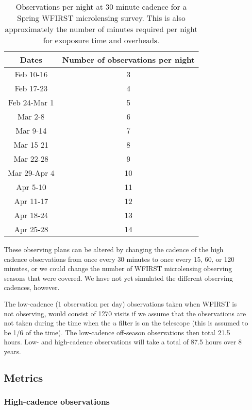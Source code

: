 \begin{table}
\begin{tabular}{ c c }
  {\bf Dates} & {\bf Number of observations per night}\\
\hline
Feb 10-16     &  3 \\
Feb 17-23     &  4 \\
Feb 24-Mar 1  &  5 \\
Mar 2-8       &  6 \\
Mar 9-14      &  7 \\
Mar 15-21     &  8 \\
Mar 22-28     &  9 \\
Mar 29-Apr 4  & 10 \\
Apr 5-10      & 11 \\
Apr 11-17     & 12 \\
Apr 18-24     & 13 \\
Apr 25-28     & 14 \\
\end{tabular}
\caption{Observations per night at 30 minute cadence for a Spring
WFIRST microlensing survey. This is also approximately the number of minutes required per night for exoposure time and overheads.}
\label{tab:wfirst_ml_survey}
\end{table}

These observing plans can be altered by changing the cadence of the high
cadence observations from once every 30 minutes to once every 15, 60,
or 120 minutes, or we could change the number of WFIRST microlensing
observing seasons that were covered. We have not yet simulated the
different observing cadences, however.

The low-cadence (1 observation per day) observations taken when WFIRST
is not observing, would consist of 1270 visits if we assume that
the observations are not taken during the time when the $u$ filter is
on the telescope (this is assumed to be 1/6 of the time). The low-cadence
off-season observations then total 21.5 hours. Low- and high-cadence
observations will take a total of 87.5 hours over 8 years.




\subsection{Metrics}
\label{sec:\secname:metrics}

\subsubsection{High-cadence observations}

